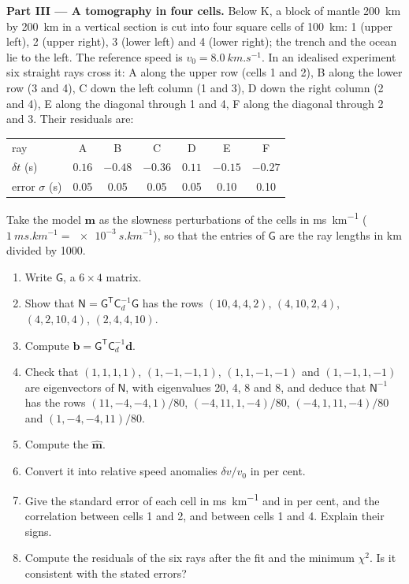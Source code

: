 \begin{problem}
\noindent\textbf{Part III --- A tomography in four cells.} Below K, a block of
mantle \qty{200}{km} by \qty{200}{km} in a vertical section is cut into four
square cells of \qty{100}{km}: 1 (upper left), 2 (upper right), 3 (lower left)
and 4 (lower right); the trench and the ocean lie to the left. The reference speed is $v_0 = \qty{8.0}{km.s^{-1}}$. In an
idealised experiment six straight rays cross it: A along the upper row (cells 1
and 2), B along the lower row (3 and 4), C down the left column (1 and 3), D
down the right column (2 and 4), E along the diagonal through 1 and 4, F along
the diagonal through 2 and 3. Their residuals are:
\begin{center}
\small
\begin{tabular}{lcccccc}
\hline
ray & A & B & C & D & E & F \\
$\delta t$ (\unit{s}) & $0.16$ & $-0.48$ & $-0.36$ & $0.11$ & $-0.15$ & $-0.27$ \\
error $\sigma$ (\unit{s}) & 0.05 & 0.05 & 0.05 & 0.05 & 0.10 & 0.10 \\
\hline
\end{tabular}
\end{center}
Take the model $\mathbf m$ as the slowness perturbations of the cells in
\unit{ms.km^{-1}} ($\qty{1}{ms.km^{-1}} = \qty{e-3}{s.km^{-1}}$), so that the
entries of $\mathsf G$ are the ray lengths in \unit{km} divided by 1000.
\begin{enumerate}[resume]
  \item Write $\mathsf G$, a $6\times4$ matrix.
  \item Show that $\mathsf N = \mathsf G^{\mathsf T}\mathsf C_d^{-1}\mathsf G$
        has the rows $(10, 4, 4, 2)$, $(4, 10, 2, 4)$, $(4, 2, 10, 4)$,
        $(2, 4, 4, 10)$.
  \item Compute $\mathbf b = \mathsf G^{\mathsf T}\mathsf C_d^{-1}\mathbf d$.
  \item Check that $(1,1,1,1)$, $(1,-1,-1,1)$, $(1,1,-1,-1)$ and $(1,-1,1,-1)$
        are eigenvectors of $\mathsf N$, with eigenvalues 20, 4, 8 and 8, and
        deduce that $\mathsf N^{-1}$ has the rows $(11, -4, -4, 1)/80$,
        $(-4, 11, 1, -4)/80$, $(-4, 1, 11, -4)/80$ and $(1, -4, -4, 11)/80$.
  \item Compute the  $\hat{\mathbf m}$.
  \item Convert it into relative speed anomalies $\delta v/v_0$ in per cent.
  \item Give the standard error of each cell in \unit{ms.km^{-1}} and in per
        cent, and the correlation between cells 1 and 2, and between cells 1
        and 4. Explain their signs.
  \item Compute the residuals of the six rays after the fit and the minimum
        $\chi^2$. Is it consistent with the stated errors?
\end{enumerate}


\end{problem}
